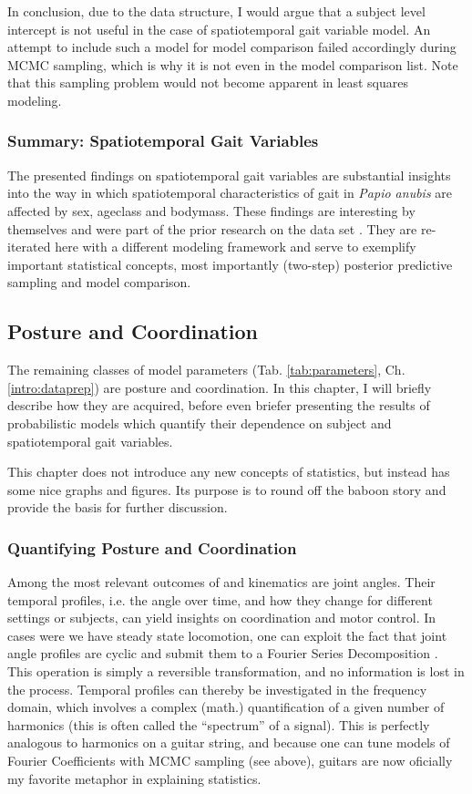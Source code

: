 In conclusion, due to the data structure, I would argue that a subject level intercept is not useful in the case of spatiotemporal gait variable model.
An attempt to include such a model for model comparison failed accordingly during MCMC sampling, which is why it is not even in the model comparison list.
Note that this sampling problem would not become apparent in least squares modeling.


\subsubsection{Summary: Spatiotemporal Gait Variables}
\label{sec:org0d94e4f}
The presented findings on spatiotemporal gait variables are substantial insights into the way in which spatiotemporal characteristics of gait in \emph{Papio anubis} are affected by sex, ageclass and bodymass.
These findings are interesting by themselves and were part of the prior research on the data set \citep[][]{Druelle2021}.
They are re-iterated here with a different modeling framework and serve to exemplify important statistical concepts, most importantly (two-step) posterior predictive sampling and model comparison.

\FloatBarrier\clearpage
\subsection{Posture and Coordination}
\label{sec:orgc82aa48}
The remaining classes of model parameters (Tab. \ref{tab:parameters}, Ch. \ref{intro:dataprep}) are posture and coordination.
In this chapter, I will briefly describe how they are acquired, before even briefer presenting the results of probabilistic models which quantify their dependence on subject and spatiotemporal gait variables.


This chapter does not introduce any new concepts of statistics, but instead has some nice graphs and figures.
Its purpose is to round off the baboon story and provide the basis for further discussion.


\subsubsection{Quantifying Posture and Coordination}
\label{sec:orgb18a99b}
Among the most relevant outcomes of  and kinematics are joint angles.
Their temporal profiles, i.e. the  angle over time, and how they change for different settings or subjects, can yield insights on coordination and motor control.
In cases were we have steady state locomotion, one can exploit the fact that joint angle profiles are cyclic and submit them to a Fourier Series Decomposition \citep[\emph{cf.}][]{Mielke2019}.
This operation is simply a reversible transformation, and no information is lost in the process.
Temporal profiles can thereby be investigated in the frequency domain, which involves a complex (math.) quantification of a given number of harmonics (this is often called the ``spectrum'' of a signal).
This is perfectly analogous to harmonics on a guitar string, and because one can tune models of Fourier Coefficients with MCMC sampling (see above), guitars are now oficially my favorite metaphor in explaining statistics.


